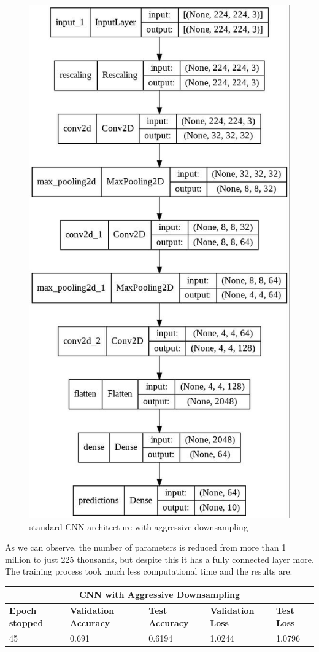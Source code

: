 \begin{figure}[H]
	\centering
	\includegraphics[height=0.6\textwidth]{img/scratch/aggressive_downsampling.jpg}
	\caption{standard CNN architecture with aggressive downsampling}
	\label{fig: AggressiveDownsamplingCNN}
\end{figure}

\noindent As we can observe, the number of parameters is reduced from more than 1 million to just 225 thousands, but despite this it has a fully connected layer more. The training process took much less computational time and the results are: 

\medskip

\begin{tabular}{ |p{2cm}|p{2cm}|p{2cm}|p{2cm}|p{2cm}|  }
\hline
\multicolumn{5}{|c|}{CNN with Aggressive Downsampling} \\
\hline
\textbf{Epoch stopped} & \textbf{Validation Accuracy} & \textbf{Test Accuracy} & \textbf{Validation Loss} & \textbf{Test Loss} \\
\hline
45 & 0.691 & 0.6194 & 1.0244 & 1.0796\\
\hline
\end{tabular}

\medskip


